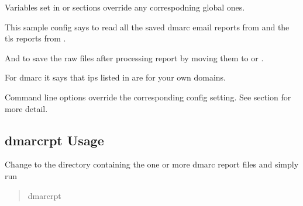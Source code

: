 \documentclass[letterpaper,10pt,english]{sphinxmanual}
\begin{document}
\begin{sphinxVerbatim}[commandchars=\\\{\}]
\PYG{p}{[}\PYG{p}{]}
      
      
      

\PYG{p}{[}\PYG{p}{]}
      \PYG{p}{[} \PYG{p}{]}
      

\PYG{p}{[}\PYG{p}{]}
      
\end{sphinxVerbatim}

\sphinxAtStartPar
Variables set in \sphinxstyleemphasis{{[}dmarc{]}} or \sphinxstyleemphasis{{[}tls{]}} sections override any correspodning global ones.

\sphinxAtStartPar
This sample config says to read all the saved dmarc email reports from  and
the tls reports from .

\sphinxAtStartPar
And to save the raw files after processing report by moving them to 
or .

\sphinxAtStartPar
For dmarc it says that ips listed in  are for your own domains.

\sphinxAtStartPar
Command line options override the corresponding config setting.
See  section for more detail.


\subsection{dmarc\sphinxhyphen{}rpt Usage}
\label{\detokenize{README:dmarc-rpt-usage}}
\sphinxAtStartPar
Change to the directory containing the one or more dmarc report files and simply run
\begin{quote}

\begin{sphinxVerbatim}[commandchars=\\\{\}]
dmarc\PYGZhy{}rpt
\end{sphinxVerbatim}
\end{quote}
\end{document}

